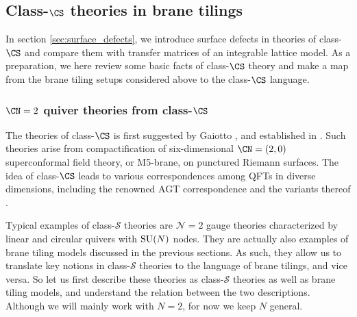 \subsection{Class-$\CS$ theories in brane tilings}

In section \ref{sec:surface_defects}, we introduce surface defects in
theories of class-$\CS$ and compare them with transfer matrices of
an integrable lattice model.
As a preparation, we here review some basic facts of class-$\CS$ theory
and make a map from the brane tiling setups considered above
to the class-$\CS$ language.






\subsubsection{$\CN=2$ quiver theories from class-$\CS$}



The theories of class-$\CS$ is first suggested by Gaiotto \cite{Gaiotto:2009we},
and established in \cite{Gaiotto:2009hg}.
Such theories arise from compactification of six-dimensional $\CN=(2,0)$ superconformal
field theory, or M5-brane, on punctured Riemann surfaces.
The idea of class-$\CS$ leads to various correspondences among QFTs in diverse dimensions,
including the renowned AGT correspondence \cite{Alday:2009aq,Wyllard:2009hg}
and the variants thereof \cite{Gadde:2009kb,Gadde:2011ik,Dimofte:2010tz,Dimofte:2011ju,Dimofte:2011py,Terashima:2011qi,Terashima:2012cx,Yagi:2013fda,Gadde:2013sca}.


Typical examples of class-$\mathcal{S}$ theories are $\mathcal{N}=2$
gauge theories characterized by linear and circular quivers with $\mathrm{SU}(N)$
nodes. They are actually also examples of brane tiling models discussed
in the previous sections. As such, they allow us to translate key
notions in class-$\mathcal{S}$ theories to the language of brane
tilings, and vice versa. So let us first describe these theories as
class-$\mathcal{S}$ theories as well as brane tiling models, and
understand the relation between the two descriptions. Although we
will mainly work with $N=2$, for now we keep $N$ general.

